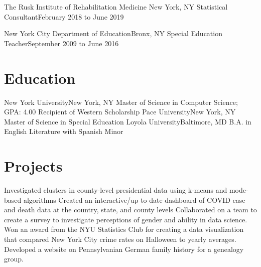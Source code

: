 \documentclass[letterpaper,11pt]{article}
\begin{document}
	\resumeSubheading
	{The Rusk Institute of Rehabilitation Medicine} {New York, NY}
	{Statistical Consultant}{February 2018 to June 2019}
		\resumeItemListStart
		\resumeItemListEnd
	
	\resumeSubheading
	{New York City Department of Education}{Bronx, NY}
	{Special Education Teacher}{September 2009 to June 2016}
		\resumeItemListStart
		\resumeItemListEnd
	\resumeSubHeadingListEnd

\section{Education}
	\resumeSubHeadingListStart
   		\resumeSubheadingAward
      		{New York University}{New York, NY}
      		{Master of Science in Computer Science;  GPA: 4.00}{}
      		{Recipient of Western Scholarship}{}
      	\resumeSubheading
      		{Pace University}{New York, NY}
      		{Master of Science in Special Education} {}
      	\resumeSubheading
      		{Loyola University}{Baltimore, MD}
      		{B.A. in English Literature with Spanish Minor}{}
    \resumeSubHeadingListEnd

\section{Projects}
\resumeItemListStart
				 {Investigated clusters in county-level presidential data using k-means and mode-based algorithms}
				 {Created an interactive/up-to-date dashboard of COVID case and death data at the country,  state,  and county levels}
				{Collaborated on a team to create a survey to investigate perceptions of gender and ability in data science.}
				 {Won an award from the NYU Statistics Club for creating a data visualization that compared New York City crime rates on Halloween to yearly averages.}
				{Developed a website on Pennsylvanian German family history for a genealogy group.}
\resumeItemListEnd
\end{document}
